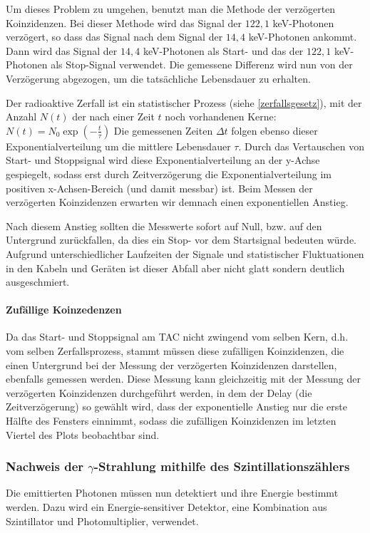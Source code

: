 \documentclass[12pt]{article}
\begin{document}
 Um dieses Problem zu umgehen, benutzt man die Methode der verzögerten Koinzidenzen. Bei dieser Methode wird das Signal der $122,1$ keV-Photonen verzögert, so dass das Signal nach dem Signal der $14,4$ keV-Photonen ankommt. Dann wird das Signal der $14,4$ keV-Photonen als Start- und das der $122,1$ keV-Photonen als Stop-Signal verwendet. Die gemessene Differenz wird nun von der Verzögerung abgezogen, um die tatsächliche Lebensdauer zu erhalten.
 
 Der radioaktive Zerfall ist ein statistischer Prozess (siehe \ref{zerfallsgesetz}), mit der Anzahl $N(t)$ der nach einer Zeit $t$ noch vorhandenen Kerne: $N(t)=N_0\exp({-\frac t \tau})$ Die gemessenen Zeiten $\Delta t$ folgen ebenso dieser Exponentialverteilung um die mittlere Lebensdauer $\tau$.
 Durch das Vertauschen von Start- und Stoppsignal wird diese Exponentialverteilung an der y-Achse gespiegelt, sodass erst durch Zeitverzögerung die Exponentialverteilung im positiven x-Achsen-Bereich  (und damit messbar) ist. Beim Messen der verzögerten Koinzidenzen erwarten wir demnach einen exponentiellen Anstieg.
 
 Nach diesem Anstieg sollten die Messwerte sofort auf Null, bzw. auf den Untergrund zurückfallen, da dies ein Stop- vor dem Startsignal bedeuten würde. Aufgrund unterschiedlicher Laufzeiten der Signale und statistischer Fluktuationen in den Kabeln und Geräten ist dieser Abfall aber nicht glatt sondern deutlich ausgeschmiert.
 
 \paragraph{Zufällige Koinzedenzen} Da das Start- und Stoppsignal am TAC nicht zwingend vom selben Kern, d.h. vom selben Zerfallsprozess, stammt müssen diese zufälligen Koinzidenzen, die einen Untergrund bei der Messung der verzögerten Koinzidenzen darstellen, ebenfalls gemessen werden. Diese Messung kann gleichzeitig mit der Messung der verzögerten Koinzidenzen durchgeführt werden, in dem der Delay (die Zeitverzögerung) so gewählt wird, dass der exponentielle Anstieg nur die erste Hälfte des Fensters einnimmt, sodass die zufälligen Koinzidenzen im letzten Viertel des Plots beobachtbar sind. 
 
 \subsubsection{Nachweis der $\gamma$-Strahlung mithilfe des Szintillationszählers}
 Die emittierten Photonen müssen nun detektiert und ihre Energie bestimmt werden. Dazu wird ein Energie-sensitiver Detektor, eine Kombination aus Szintillator und Photomultiplier, verwendet.
\end{document}
